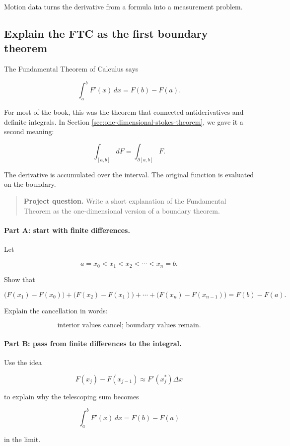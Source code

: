 Motion data turns the derivative from a formula into a measurement problem.

\subsection{Explain the FTC as the first boundary theorem}
\label{subsec:project-ftc-boundary-theorem}

The Fundamental Theorem of Calculus says

\[
\int_a^b F'(x)\,dx=F(b)-F(a).
\]

For most of the book, this was the theorem that connected antiderivatives and definite
integrals.  In Section \ref{sec:one-dimensional-stokes-theorem}, we gave it a second
meaning:

\[
\boxed{
\int_{[a,b]} dF=\int_{\partial[a,b]}F.
}
\]

The derivative is accumulated over the interval.  The original function is evaluated on
the boundary.

\begin{quote}
\textbf{Project question.}
Write a short explanation of the Fundamental Theorem as the one-dimensional version
of a boundary theorem.
\end{quote}

\paragraph{Part A: start with finite differences.}
Let

\[
a=x_0<x_1<x_2<\cdots<x_n=b.
\]

Show that

\[
\bigl(F(x_1)-F(x_0)\bigr)
+
\bigl(F(x_2)-F(x_1)\bigr)
+\cdots+
\bigl(F(x_n)-F(x_{n-1})\bigr)
=
F(b)-F(a).
\]

Explain the cancellation in words:

\[
\boxed{
\text{interior values cancel; boundary values remain.}
}
\]

\paragraph{Part B: pass from finite differences to the integral.}
Use the idea

\[
F(x_j)-F(x_{j-1})
\approx
F'(x_j^*)\Delta x
\]

to explain why the telescoping sum becomes

\[
\int_a^b F'(x)\,dx=F(b)-F(a)
\]

in the limit.

